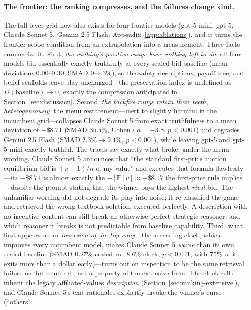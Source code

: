 \paragraph{The frontier: the ranking compresses, and the failures change kind.}
The full lever grid now also exists for four frontier models (gpt-5-mini,
gpt-5, Claude Sonnet 5, Gemini 2.5 Flash; Appendix~\ref{app:ablations}), and
it turns the frontier scope condition from an extrapolation into a
measurement. Three facts summarize it. First, \emph{the ranking's positive
rungs have nothing left to do}: all four models bid essentially exactly
truthfully at every sealed-bid baseline (mean deviations $0.00$--$0.30$,
SMAD $0$--$2.3\%$), so the safety descriptions, payoff tree, and belief
scaffolds leave play unchanged---the preservation index is undefined as
$D(\text{baseline}) \to 0$, exactly the compression anticipated in
Section~\ref{sec:discussion}. Second, \emph{the backfire rungs retain their
teeth, heterogeneously}: the menu restatement---inert to slightly harmful in
the incumbent grid---collapses Claude Sonnet 5 from exact truthfulness to a
mean deviation of $-\$8.71$ (SMAD $35.5\%$, Cohen's $d = -3.8$,
$p < 0.001$) and degrades Gemini 2.5 Flash (SMAD $2.3\% \to 9.1\%$,
$p < 0.001$), while leaving gpt-5 and gpt-5-mini exactly truthful. The
traces say exactly what broke: under the menu wording, Claude Sonnet 5
announces that ``the standard first-price auction equilibrium bid is
$(n-1)/n$ of my value'' and executes that formula flawlessly---its
$-\$8.71$ is almost exactly the $-\tfrac{1}{3}\,\mathbb{E}[v] \approx
-\$8.17$ the first-price rule implies---despite the prompt stating that
the winner pays the highest \emph{rival} bid. The unfamiliar wording did
not degrade its play into noise; it re-classified the game and retrieved
the wrong textbook solution, executed perfectly. A description with no
incentive content can still break an otherwise perfect strategic reasoner,
and which reasoner it breaks is not predictable from baseline capability. Third, what first appears as an
\emph{inversion of the top rung}---the ascending clock, which improves
every incumbent model, makes Claude Sonnet 5 \emph{worse} than its own
sealed baseline (SMAD $0.27\%$ sealed vs.\ $8.6\%$ clock, $p<0.001$, with
$75\%$ of its exits more than a dollar early)---turns out on inspection to
be the same retrieval failure as the menu cell, not a property of the
extensive form. The clock cells inherit the legacy affiliated-values
\emph{description} (Section~\ref{sec:ranking-extensive}), and Claude
Sonnet 5's exit rationales explicitly invoke the winner's curse (``others'
